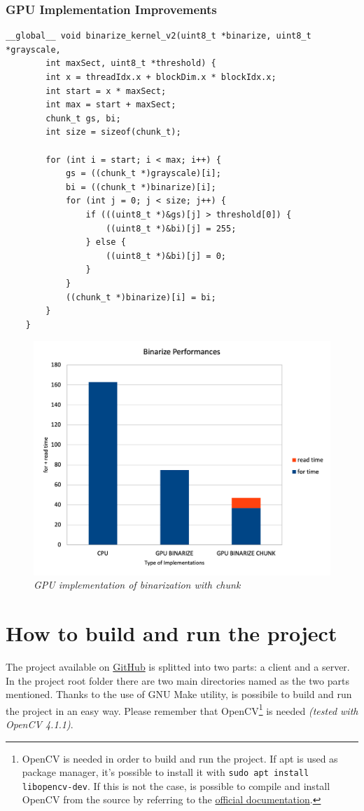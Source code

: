 \documentclass[paper=a4, fontsize=10pt]{scrartcl}	%
\begin{document}
	\subsubsection{GPU Implementation Improvements}

	\begin{lstlisting}[style=CStyle]
	__global__ void binarize_kernel_v2(uint8_t *binarize, uint8_t *grayscale, 
		int maxSect, uint8_t *threshold) {
		int x = threadIdx.x + blockDim.x * blockIdx.x;
		int start = x * maxSect;
		int max = start + maxSect;
		chunk_t gs, bi;
		int size = sizeof(chunk_t);
	
		for (int i = start; i < max; i++) {
			gs = ((chunk_t *)grayscale)[i];
			bi = ((chunk_t *)binarize)[i];
			for (int j = 0; j < size; j++) {
				if (((uint8_t *)&gs)[j] > threshold[0]) {
					((uint8_t *)&bi)[j] = 255;
				} else {
					((uint8_t *)&bi)[j] = 0;
				}
			}
			((chunk_t *)binarize)[i] = bi;
		}
	}
	\end{lstlisting}


	\begin{figure}[H]
		\centering
		\includegraphics[width=0.75\linewidth]{images/binarization/bin3.png}
		\caption{\textit{GPU implementation of binarization with chunk}}
		\label{fig:gpu-bin-chunk}
	\end{figure}
	

	\newpage
	\section{How to build and run the project}

	The project available on \href{https://github.com/MatteoBattilana/CUDAVideoStream}{GitHub} is splitted into two parts: a client and a server. In the project root folder there are two main directories named as the two parts mentioned. Thanks to the use of GNU Make utility, is possibile to build and run the project in an easy way. Please remember that OpenCV\footnote{OpenCV is needed in order to build and run the project. If apt is used as package manager, it's possible to install it with \texttt{sudo apt install libopencv-dev}. If this is not the case, is possible to compile and install OpenCV from the source by referring to the \href{https://docs.opencv.org/4.x/d7/d9f/tutorial\_linux\_install.html}{official documentation}.} is needed \textit{(tested with OpenCV 4.1.1)}.\\
	
\end{document}
